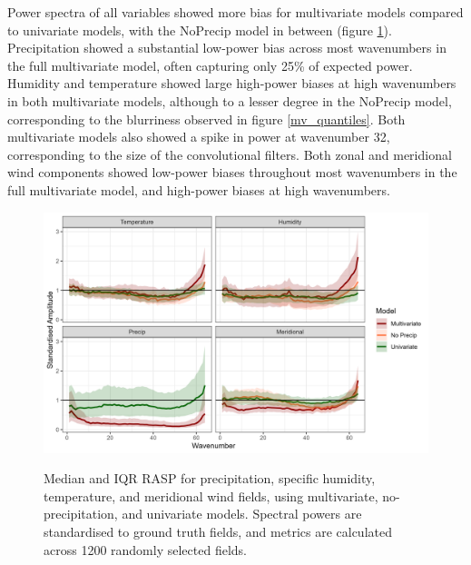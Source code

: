 \documentclass{ametsocV6.1}
\begin{document}
Power spectra of all variables showed more bias for multivariate models compared to univariate models, with the NoPrecip model in between (figure \ref{mv_rasp}). Precipitation showed a substantial low-power bias across most wavenumbers in the full multivariate model, often capturing only 25\% of expected power. Humidity and temperature showed large high-power biases at high wavenumbers in both multivariate models, although to a lesser degree in the NoPrecip model, corresponding to the blurriness observed in figure \ref{mv_quantiles}. Both multivariate models also showed a spike in power at wavenumber 32, corresponding to the size of the convolutional filters. Both zonal and meridional wind components showed low-power biases throughout most wavenumbers in the full multivariate model, and high-power biases at high wavenumbers. 
\begin{figure}[H]
  \noindent\includegraphics[width=\textwidth,angle=0]{final/MV_UV_RASP.png}\\
  \caption{Median and IQR RASP for precipitation, specific humidity, temperature, and meridional wind fields, using multivariate, no-precipitation, and univariate models. Spectral powers are standardised to ground truth fields, and metrics are calculated across 1200 randomly selected fields. }\label{mv_rasp}
\end{figure}
\end{document}
